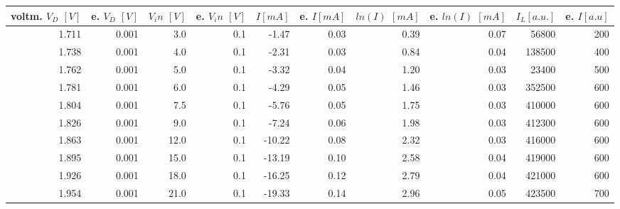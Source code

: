 \begin{tabular}{rrrrrrrrrr}
\toprule
voltm. $V_D$ $[V]$ & e. $V_D$ $[V]$ & $V_in$ $[V]$ & e. $V_in$ $[V]$ & $I [mA]$  & e. $I [mA]$ &  $ln(I)$ $[mA]$ & e. $ln(I)$ $[mA]$ & $I_L[a.u.]$ & e. $I[a.u]$ \\
\midrule
1.711 & 0.001 & 3.0 & 0.1 & -1.47 & 0.03 & 0.39 & 0.07 & 56800 & 200 \\
1.738 & 0.001 & 4.0 & 0.1 & -2.31 & 0.03 & 0.84 & 0.04 & 138500 & 400 \\
1.762 & 0.001 & 5.0 & 0.1 & -3.32 & 0.04 & 1.20 & 0.03 & 23400 & 500 \\
1.781 & 0.001 & 6.0 & 0.1 & -4.29 & 0.05 & 1.46 & 0.03 & 352500 & 600 \\
1.804 & 0.001 & 7.5 & 0.1 & -5.76 & 0.05 & 1.75 & 0.03 & 410000 & 600 \\
1.826 & 0.001 & 9.0 & 0.1 & -7.24 & 0.06 & 1.98 & 0.03 & 412300 & 600 \\
1.863 & 0.001 & 12.0 & 0.1 & -10.22 & 0.08 & 2.32 & 0.03 & 416000 & 600 \\
1.895 & 0.001 & 15.0 & 0.1 & -13.19 & 0.10 & 2.58 & 0.04 & 419000 & 600 \\
1.926 & 0.001 & 18.0 & 0.1 & -16.25 & 0.12 & 2.79 & 0.04 & 421000 & 600 \\
1.954 & 0.001 & 21.0 & 0.1 & -19.33 & 0.14 & 2.96 & 0.05 & 423500 & 700 \\
\bottomrule
\end{tabular}




